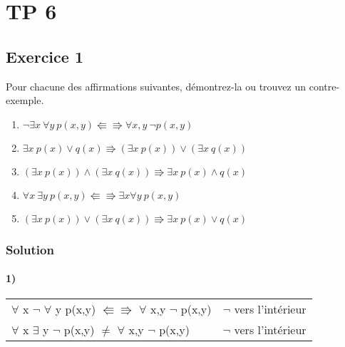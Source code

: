 \section{TP 6}

\subsection*{Exercice 1}
Pour chacune des affirmations suivantes, démontrez-la ou trouvez un contre-exemple.
\begin{enumerate}
	\item $\neg \exists x \ \forall y \ p(x, y) \Lleftarrow\!\!\!\!\Rrightarrow \forall x, y \ \neg p(x, y)$
	\item $\exists x \ p(x) \vee q(x) \Rrightarrow (\exists x \ p(x)) \vee (\exists x \ q(x))$
	\item $(\exists x \ p(x)) \wedge (\exists x \ q(x)) \Rrightarrow \exists x \ p(x) \wedge q(x)$
	\item $\forall x \ \exists y \ p(x, y) \Lleftarrow\!\!\!\!\Rrightarrow \exists x \forall y \ p(x, y)$
	\item $(\exists x \ p(x)) \vee (\exists x \ q(x)) \Rrightarrow \exists x \ p(x) \vee q(x)$
\end{enumerate}

    \subsubsection*{Solution}
  
    \paragraph{1)}  
        \begin{tabular}{|l|l|}
        \hline
        $\forall$ x $\neg$ $\forall$ y p(x,y) $\Lleftarrow \Rrightarrow$ $\forall$ x,y $\neg$ p(x,y) & $\neg$ vers l'intérieur\\
        $\forall$ x $\exists$ y $\neg$ p(x,y) $\ne$ $\forall$ x,y $\neg$ p(x,y)& $\neg$ vers l'intérieur\\
        \hline
        \end{tabular}
    
